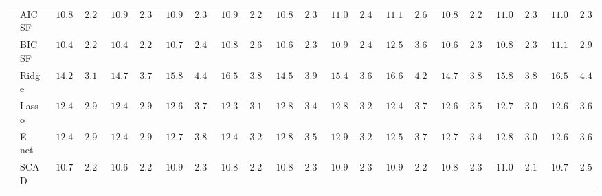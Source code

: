 \begin{tabular}{p{0.2cm}p{1cm}|p{0.6cm}p{0.6cm}|p{0.6cm}p{0.6cm}p{0.6cm}p{0.6cm}p{0.6cm}p{0.6cm}|p{0.6cm}p{0.6cm}p{0.6cm}p{0.6cm}p{0.6cm}p{0.6cm}|p{0.6cm}p{0.6cm}p{0.6cm}p{0.6cm}p{0.6cm}p{0.6cm}}
 & AIC SF  & $\phantom{0}10.88$ & $\phantom{0}2.22$ & $\phantom{0}10.92$ & $\phantom{0}2.34$ & $\phantom{0}10.94$ & $\phantom{0}2.31$ & $\phantom{0}10.90$ & $\phantom{0}2.26$ & $\phantom{0}10.81$ & $\phantom{0}2.31$ & $\phantom{0}11.07$ & $\phantom{0}2.46$ & $\phantom{0}11.15$ & $\phantom{0}2.68$ & $\phantom{0}10.88$ & $\phantom{0}2.24$ & $\phantom{0}11.02$ & $\phantom{0}2.36$ & $\phantom{0}11.01$ & $\phantom{0}2.31$ \\
 & BIC SF  & $\phantom{0}10.43$ & $\phantom{0}2.27$ & $\phantom{0}10.49$ & $\phantom{0}2.25$ & $\phantom{0}10.73$ & $\phantom{0}2.44$ & $\phantom{0}10.81$ & $\phantom{0}2.63$ & $\phantom{0}10.61$ & $\phantom{0}2.35$ & $\phantom{0}10.90$ & $\phantom{0}2.41$ & $\phantom{0}12.52$ & $\phantom{0}3.69$ & $\phantom{0}10.62$ & $\phantom{0}2.30$ & $\phantom{0}10.81$ & $\phantom{0}2.30$ & $\phantom{0}11.17$ & $\phantom{0}2.98$ \\
 & Ridge  & $\phantom{0}14.28$ & $\phantom{0}3.13$ & $\phantom{0}14.76$ & $\phantom{0}3.73$ & $\phantom{0}15.83$ & $\phantom{0}4.41$ & $\phantom{0}16.52$ & $\phantom{0}3.86$ & $\phantom{0}14.53$ & $\phantom{0}3.95$ & $\phantom{0}15.46$ & $\phantom{0}3.63$ & $\phantom{0}16.69$ & $\phantom{0}4.26$ & $\phantom{0}14.76$ & $\phantom{0}3.81$ & $\phantom{0}15.83$ & $\phantom{0}3.86$ & $\phantom{0}16.58$ & $\phantom{0}4.47$ \\
 & Lasso  & $\phantom{0}12.45$ & $\phantom{0}2.93$ & $\phantom{0}12.43$ & $\phantom{0}2.98$ & $\phantom{0}12.60$ & $\phantom{0}3.77$ & $\phantom{0}12.33$ & $\phantom{0}3.19$ & $\phantom{0}12.80$ & $\phantom{0}3.49$ & $\phantom{0}12.88$ & $\phantom{0}3.21$ & $\phantom{0}12.48$ & $\phantom{0}3.71$ & $\phantom{0}12.67$ & $\phantom{0}3.50$ & $\phantom{0}12.74$ & $\phantom{0}3.02$ & $\phantom{0}12.63$ & $\phantom{0}3.64$ \\
 & E-net  & $\phantom{0}12.45$ & $\phantom{0}2.94$ & $\phantom{0}12.48$ & $\phantom{0}2.95$ & $\phantom{0}12.70$ & $\phantom{0}3.89$ & $\phantom{0}12.40$ & $\phantom{0}3.21$ & $\phantom{0}12.84$ & $\phantom{0}3.51$ & $\phantom{0}12.95$ & $\phantom{0}3.27$ & $\phantom{0}12.55$ & $\phantom{0}3.72$ & $\phantom{0}12.74$ & $\phantom{0}3.48$ & $\phantom{0}12.83$ & $\phantom{0}3.06$ & $\phantom{0}12.67$ & $\phantom{0}3.64$ \\
 & SCAD  & $\phantom{0}10.78$ & $\phantom{0}2.20$ & $\phantom{0}10.65$ & $\phantom{0}2.23$ & $\phantom{0}10.94$ & $\phantom{0}2.32$ & $\phantom{0}10.83$ & $\phantom{0}2.28$ & $\phantom{0}10.81$ & $\phantom{0}2.35$ & $\phantom{0}10.97$ & $\phantom{0}2.36$ & $\phantom{0}10.95$ & $\phantom{0}2.27$ & $\phantom{0}10.87$ & $\phantom{0}2.33$ & $\phantom{0}11.02$ & $\phantom{0}2.15$ & $\phantom{0}10.77$ & $\phantom{0}2.54$ \\

\end{tabular}
